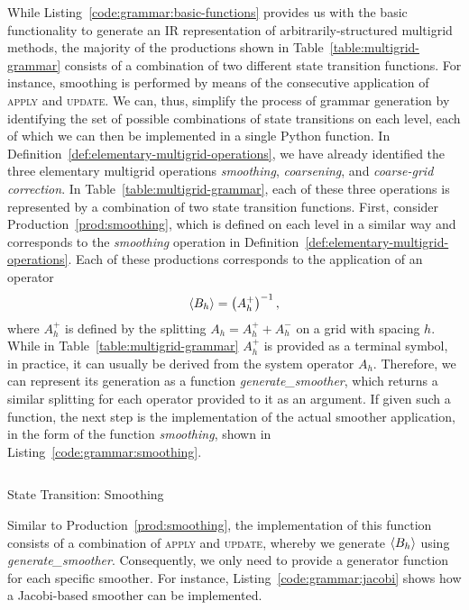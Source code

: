 While Listing~\ref{code:grammar:basic-functions} provides us with the basic functionality to generate an IR representation of arbitrarily-structured multigrid methods, the majority of the productions shown in Table~\ref{table:multigrid-grammar} consists of a combination of two different state transition functions.
For instance, smoothing is performed by means of the consecutive application of \textsc{apply} and \textsc{update}.
We can, thus, simplify the process of grammar generation by identifying the set of possible combinations of state transitions on each level, each of which we can then be implemented in a single Python function.
In Definition~\ref{def:elementary-multigrid-operations}, we have already identified the three elementary multigrid operations \emph{smoothing}, \emph{coarsening}, and \emph{coarse-grid correction}.
In Table~\ref{table:multigrid-grammar}, each of these three operations is represented by a combination of two state transition functions.
First, consider Production~\ref{prod:smoothing}, which is defined on each level in a similar way and corresponds to the \emph{smoothing} operation in Definition~\ref{def:elementary-multigrid-operations}.
Each of these productions corresponds to the application of an operator
\begin{equation*}
	\langle B_{h} \rangle = \left( A^+_{h} \right)^{-1},
\end{equation*}
where $A^+_{h}$ is defined by the splitting $A_{h} = A^+_{h} + A^-_{h}$ on a grid with spacing $h$.
While in Table~\ref{table:multigrid-grammar} $A^+_{h}$ is provided as a terminal symbol, in practice, it can usually be derived from the system operator $A_{h}$.
Therefore, we can represent its generation as a function \emph{generate\_smoother}, which returns a similar splitting for each operator provided to it as an argument.
If given such a function, the next step is the implementation of the actual smoother application, in the form of the function \emph{smoothing}, shown in Listing~\ref{code:grammar:smoothing}.
\begin{listing}
	\inputminted{python}{evostencils/grammar/smoothing.py}
	\caption{State Transition: Smoothing}
	\label{code:grammar:smoothing}
\end{listing}
Similar to Production~\ref{prod:smoothing}, the implementation of this function consists of a combination of \textsc{apply} and \textsc{update}, whereby we generate $\langle B_{h} \rangle$ using \emph{generate\_smoother}.
Consequently, we only need to provide a generator function for each specific smoother.
For instance, Listing~\ref{code:grammar:jacobi} shows how a Jacobi-based smoother can be implemented.

